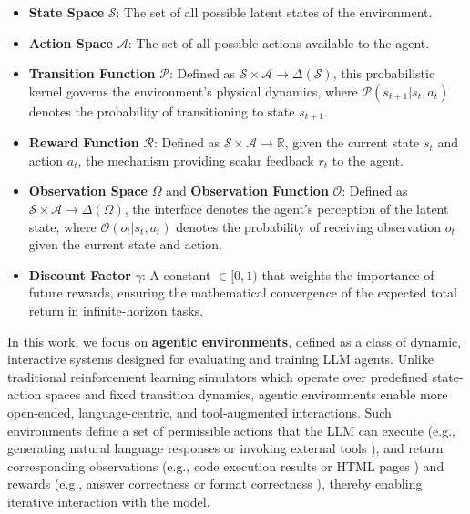 \begin{itemize}
    \item \textbf{State Space} $\mathcal{S}$: The set of all possible latent states of the environment.
    \item \textbf{Action Space} $\mathcal{A}$: The set of all possible actions available to the agent.
    \item \textbf{Transition Function} $\mathcal{P}$: Defined as $\mathcal{S} \times \mathcal{A} \rightarrow \Delta(\mathcal{S})$, this probabilistic kernel governs the environment's physical dynamics, where $\mathcal{P}(s_{t+1} | s_t, a_t)$ denotes the probability of transitioning to state $s_{t+1}$.
    \item \textbf{Reward Function} $\mathcal{R}$: Defined as $\mathcal{S} \times \mathcal{A} \rightarrow \mathbb{R}$, given the current state $s_t$ and action $a_t$, the mechanism providing scalar feedback $r_t$ to the agent.
    \item \textbf{Observation Space} $\Omega$ and \textbf{Observation Function} $\mathcal{O}$: Defined as $\mathcal{S} \times \mathcal{A} \rightarrow \Delta(\Omega)$, the interface denotes the agent's perception of the latent state, where $\mathcal{O}(o_t | s_t, a_t)$ denotes the probability of receiving observation $o_t$ given the current state and action.
    \item  \textbf{Discount Factor} $\gamma$: A constant $\in [0, 1)$ that weights the importance of future rewards, ensuring the mathematical convergence of the expected total return in infinite-horizon tasks.
\end{itemize}
In this work, we focus on \textbf{agentic environments}, defined as a class of dynamic, interactive systems designed for evaluating and training LLM agents. 
Unlike traditional reinforcement learning simulators which operate over predefined state-action spaces and fixed transition dynamics, agentic environments enable more open-ended, language-centric, and tool-augmented interactions.
Such environments define a set of permissible actions that the LLM can execute (e.g., generating natural language responses \cite{ALFWorld, MLE-bench, Openai_gym} or invoking external tools \cite{ToolACE, Toolformer, ToolRL}), and return corresponding observations (e.g., code execution results \cite{SWE-Bench,Terminal-Bench, LiveCodeBench} or HTML pages \cite{WebShop, WebArena, WebVoyager}) and rewards (e.g., answer correctness or format correctness \cite{LLMARENA, HLE, GAIA}), thereby enabling iterative interaction with the model.


